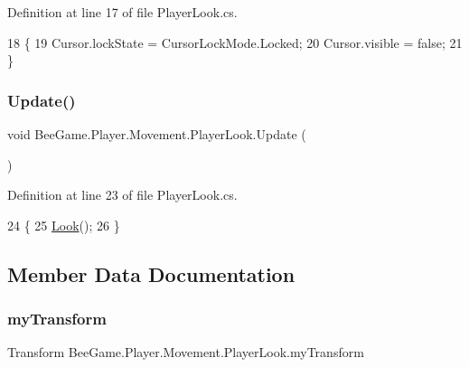 Definition at line 17 of file Player\+Look.\+cs.


\begin{DoxyCode}
18         \{
19             Cursor.lockState = CursorLockMode.Locked;
20             Cursor.visible = \textcolor{keyword}{false};
21         \}
\end{DoxyCode}
\mbox{\label{class_bee_game_1_1_player_1_1_movement_1_1_player_look_a6c3528a5b241f1169b8c5584401bbed2}} 
\subsubsection{\texorpdfstring{Update()}{Update()}}
{\footnotesize\ttfamily void Bee\+Game.\+Player.\+Movement.\+Player\+Look.\+Update (\begin{DoxyParamCaption}{ }\end{DoxyParamCaption})\hspace{0.3cm}{\ttfamily [private]}}



Definition at line 23 of file Player\+Look.\+cs.


\begin{DoxyCode}
24         \{
25             \hyperlink{class_bee_game_1_1_player_1_1_movement_1_1_player_look_a7ff4392d11c1a3c25b80a207de1b5536}{Look}();
26         \}
\end{DoxyCode}


\subsection{Member Data Documentation}
\mbox{\label{class_bee_game_1_1_player_1_1_movement_1_1_player_look_a1b69a0e4304df8fa02e0de3e01b6496b}} 
\subsubsection{\texorpdfstring{my\+Transform}{myTransform}}
{\footnotesize\ttfamily Transform Bee\+Game.\+Player.\+Movement.\+Player\+Look.\+my\+Transform}



